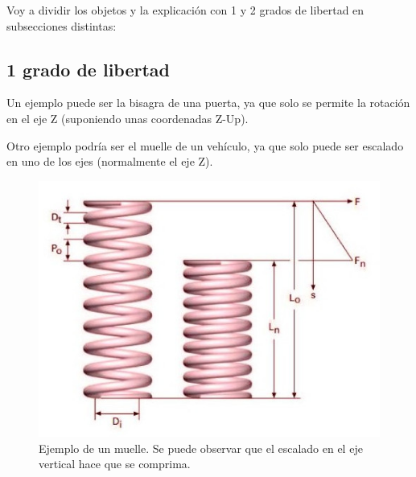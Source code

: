 \documentclass{article}
\begin{document}
Voy a dividir los objetos y la explicación con 1 y 2 grados de libertad en subsecciones distintas:

\subsection{1 grado de libertad}

Un ejemplo puede ser la bisagra de una puerta, ya que solo se permite la rotación en el eje Z (suponiendo unas coordenadas Z-Up).

\bigskip

Otro ejemplo podría ser el muelle de un vehículo, ya que solo puede ser escalado en uno de los ejes (normalmente el eje Z).

\begin{figure}[H]
   \centering
   \includegraphics[width=\textwidth]{imagenes/muelle.jpg}
   \caption{Ejemplo de un muelle. Se puede observar que el escalado en el eje vertical hace que se comprima\cite{muelle}.}
\end{figure}
\end{document}
